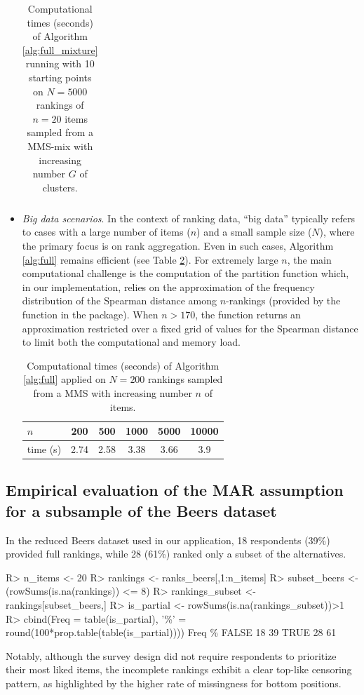 \begin{itemize}
\begin{table}[h]
\begin{tabular}{|l|c|c|c|c|c|}
\end{tabular}
\caption{ Computational times (seconds) of Algorithm \ref{alg:full_mixture} running with 10 starting points on $N=5000$ rankings of $n=20$ items sampled from a MMS-mix with increasing number $G$ of clusters.}
\label{largeG}
\end{table}
\item \textit{Big data scenarios}. In the context of ranking data, ``big data'' typically refers to cases with a large number of items ($n$) and a small sample size ($N$), where the primary focus is on rank aggregation. Even in such cases, Algorithm \ref{alg:full} remains efficient (see Table \ref{bigdata}). 
For extremely large $n$, the main computational challenge is the computation of the partition function which, in our implementation, relies on  the approximation of the frequency distribution of the Spearman distance among $n$-rankings (provided by the  function in the package). When $n>170$, the function returns an approximation restricted over a fixed grid of values for the Spearman distance to limit both the computational and memory load.
\begin{table}[h!]
\centering
\begin{tabular}{|l|c|c|c|c|c|}
\hline
$n$        & 200  & 500  & 1000 & 5000 & 10000 \\ \hline
time (s) & 2.74 & 2.58 & 3.38 & 3.66 & 3.9   \\ \hline
\end{tabular}
\caption{ Computational times (seconds) of Algorithm \ref{alg:full} applied on $N=200$ rankings sampled from a MMS with increasing number $n$ of items.}
\label{bigdata}
\end{table}
\end{itemize}

\subsection{Empirical evaluation of the MAR assumption for a subsample of the Beers dataset}
\label{app:censoring_beers}

In the reduced Beers dataset used in our application, 18 respondents (39\%) provided full rankings, while 28 (61\%) ranked only a subset of the alternatives.
%
\begin{example*}
R> n\_items <- 20
R> rankings <- ranks\_beers[,1:n\_items]
R> subset\_beers <- (rowSums(is.na(rankings)) <= 8)
R> rankings\_subset <- rankings[subset\_beers,]
R> is\_partial <- rowSums(is.na(rankings\_subset))>1
R> cbind(Freq = table(is\_partial), '\%' = round(100*prop.table(table(is\_partial))))
     Freq  \%
FALSE   18 39
TRUE    28 61    
\end{example*}
%
Notably, although the survey design did not require respondents to prioritize their most liked items, the incomplete rankings exhibit a clear top-like censoring pattern, as highlighted by the higher rate of missingness for bottom positions. 


